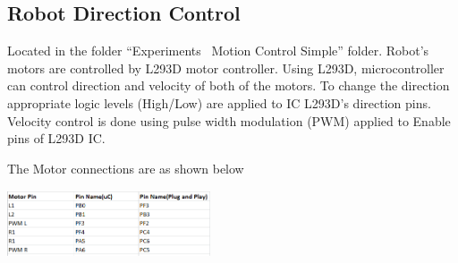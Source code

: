 \documentclass[a4paper,12pt,oneside]{article}
\begin{document}
		\subsection{\huge \textbf{Robot Direction Control}}
			{Located in the folder “Experiments \ Motion Control Simple” folder. Robot’s motors are controlled by L293D motor controller. Using L293D, microcontroller can control direction and velocity of both of the motors. To change the direction appropriate logic levels (High/Low) are applied to IC L293D’s direction pins. Velocity control is done using pulse width modulation (PWM) applied to Enable pins of L293D IC.\\}
			
			The Motor connections are as shown below 
			
			\begin{center}
				\includegraphics[width=6cm, height=2cm]{MotorConnection}
			\end{center}
			
\end{document}
